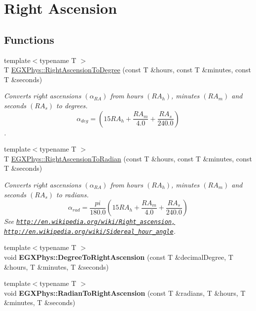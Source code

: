 \hypertarget{group___e_g_x_phys-_astrophysics-_right_ascension}{}\section{Right Ascension}
\label{group___e_g_x_phys-_astrophysics-_right_ascension}
\subsection*{Functions}
\begin{DoxyCompactItemize}
\item 
{\footnotesize template$<$typename T $>$ }\\T \mbox{\hyperlink{group___e_g_x_phys-_astrophysics-_right_ascension_ga30e95e529dac871efc014c8ca0108c0d}{E\+G\+X\+Phys\+::\+Right\+Ascension\+To\+Degree}} (const T \&hours, const T \&minutes, const T \&seconds)
\begin{DoxyCompactList}\small\item\em Converts right ascensions $(\alpha_{RA})$ from hours $(RA_h)$, minutes $(RA_m)$ and seconds $(RA_s)$ to degrees. \[\alpha_{deg}=(15 RA_h + \frac{RA_m}{4.0} + \frac{RA_s}{240.0})\]. \end{DoxyCompactList}\item 
{\footnotesize template$<$typename T $>$ }\\T \mbox{\hyperlink{group___e_g_x_phys-_astrophysics-_right_ascension_gad90de181361375b745a9b226fa13ba14}{E\+G\+X\+Phys\+::\+Right\+Ascension\+To\+Radian}} (const T \&hours, const T \&minutes, const T \&seconds)
\begin{DoxyCompactList}\small\item\em Converts right ascensions $(\alpha_{RA})$ from hours $(RA_h)$, minutes $(RA_m)$ and seconds $(RA_s)$ to radians. \[\alpha_{rad}=\frac{pi}{180.0}(15 RA_h + \frac{RA_m}{4.0} + \frac{RA_s}{240.0})\] See \href{http://en.wikipedia.org/wiki/Right_ascension,}{\tt http\+://en.\+wikipedia.\+org/wiki/\+Right\+\_\+ascension,} \href{http://en.wikipedia.org/wiki/Sidereal_hour_angle}{\tt http\+://en.\+wikipedia.\+org/wiki/\+Sidereal\+\_\+hour\+\_\+angle}. \end{DoxyCompactList}\item 
\mbox{\label{group___e_g_x_phys-_astrophysics-_right_ascension_gabdd9d1c686dd5e2580518f526b78295f}} 
{\footnotesize template$<$typename T $>$ }\\void {\bfseries E\+G\+X\+Phys\+::\+Degree\+To\+Right\+Ascension} (const T \&decimal\+Degree, T \&hours, T \&minutes, T \&seconds)
\item 
\mbox{\label{group___e_g_x_phys-_astrophysics-_right_ascension_ga50c306a7d118d3b3c02bc3621e1cb078}} 
{\footnotesize template$<$typename T $>$ }\\void {\bfseries E\+G\+X\+Phys\+::\+Radian\+To\+Right\+Ascension} (const T \&radians, T \&hours, T \&minutes, T \&seconds)
\end{DoxyCompactItemize}


